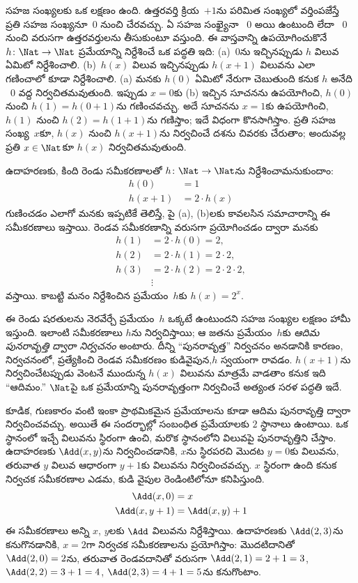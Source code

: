 \documentclass[../../../include/open-logic-section]{subfiles}
\begin{document}

సహజ సంఖ్యలకు ఒక లక్షణం ఉంది. ఉత్తరవర్తి క్రియ~$+1$ను పరిమిత సంఖ్యలో
వర్తింపజేస్తే ప్రతి సహజ సంఖ్యనూ~$0$ నుంచి చేరవచ్చు. ఏ సహజ సంఖ్యైనా
~$0$ అయి ఉంటుంది లేదా ~$0$ నుంచి వరుసగా ఉత్తరవర్తులను తీసుకుంటూ వస్తుంది. ఈ వాస్తవాన్ని
ఉపయోగించుకొనే $h\colon\Nat \to \Nat$ ప్రమేయాన్ని నిర్దేశించే ఒక
పద్ధతి ఇది: (a)~$0$ను ఇచ్చినప్పుడు $h$ విలువ ఏమిటో నిర్దేశించాలి.
(b)~$h(x)$ విలువ ఇచ్చినప్పుడు $h(x+1)$ విలువను ఎలా గణించాలో కూడా
నిర్దేశించాలి. (a) మనకు $h(0)$ ఏమిటో నేరుగా చెబుతుంది కనుక $h$ అనేది
~$0$ వద్ద నిర్వచితమవుతుంది. ఇప్పుడు $x=0$కు (b) ఇచ్చిన సూచనను
ఉపయోగించి, $h(0)$ నుంచి $h(1)=h(0+1)$ను గణించవచ్చు. అదే సూచనను
$x=1$కు ఉపయోగించి, $h(1)$ నుంచి $h(2)=h(1+1)$ను గణిస్తాం; ఇదే విధంగా
కొనసాగిస్తాం. ప్రతి సహజ సంఖ్య~$x$కూ, $h(x)$ నుంచి $h(x+1)$ను
నిర్వచించే దశను చివరకు చేరుతాం; అందువల్ల ప్రతి $x\in\Nat$కూ $h(x)$
నిర్వచితమవుతుంది.

ఉదాహరణకు, కింది రెండు సమీకరణాలతో $h\colon \Nat \to \Nat$ను
నిర్దేశించామనుకుందాం:
\begin{align*}
h(0) & =  1\\
h(x+1) & =  2 \cdot h(x)
\end{align*}
గుణించడం ఎలాగో మనకు ఇప్పటికే తెలిస్తే, పై (a), (b)లకు కావలసిన
సమాచారాన్ని ఈ సమీకరణాలు ఇస్తాయి. రెండవ సమీకరణాన్ని వరుసగా
ప్రయోగించడం ద్వారా మనకు
\begin{align*}
  h(1) & = 2\cdot h(0) = 2,\\
  h(2) & = 2\cdot h(1) = 2\cdot 2,\\
  h(3) & = 2 \cdot h(2) = 2\cdot 2 \cdot 2,\\
  & \vdots
\end{align*}
వస్తాయి. కాబట్టి మనం నిర్దేశించిన ప్రమేయం~$h$కు $h(x)=2^x$.

ఈ రెండు షరతులను నెరవేర్చే ప్రమేయం~$h$ ఒక్కటే ఉంటుందని సహజ సంఖ్యల
లక్షణం హామీ ఇస్తుంది. ఇలాంటి సమీకరణాలు $h$ను నిర్వచిస్తాయి; ఆ జతను ప్రమేయం~$h$కు
\emph{ఆదిమ పునరావృత్తి ద్వారా నిర్వచనం} అంటారు. దీన్ని
``పునరావృత్త'' నిర్వచనం అనడానికి కారణం, నిర్వచనంలో, ప్రత్యేకించి
రెండవ సమీకరణం కుడివైపున,$h$ స్వయంగా రావడం. $h(x+1)$ను
నిర్వచించేటప్పుడు వెంటనే ముందున్న $h(x)$ విలువను మాత్రమే వాడతాం కనుక
ఇది ``ఆదిమం.'' $\Nat$పై ఒక ప్రమేయాన్ని పునరావృత్తంగా నిర్వచించే
అత్యంత సరళ పద్ధతి ఇదే.

కూడిక, గుణకారం వంటి ఇంకా ప్రాథమికమైన ప్రమేయాలను కూడా ఆదిమ
పునరావృత్తి ద్వారా నిర్వచించవచ్చు. అయితే ఈ సందర్భాల్లో సంబంధిత
ప్రమేయాలకు $2$ స్థానాలు ఉంటాయి. ఒక స్థానంలో ఇచ్చే విలువను స్థిరంగా ఉంచి,
మరొక స్థానంలోని విలువపై పునరావృత్తిని చేస్తాం. ఉదాహరణకు $\Add(x,y)$ను
నిర్వచించడానికి, $x$ను స్థిరపరచి మొదట $y=0$కు విలువను, తరువాత $y$
విలువ ఆధారంగా $y+1$కు విలువను నిర్వచించవచ్చు. $x$ స్థిరంగా ఉంది కనుక
నిర్వచక సమీకరణాల ఎడమ, కుడి వైపుల రెండింటిలోనూ కనిపిస్తుంది.
\begin{align*}
\Add(x,0) & =  x\\
\Add(x,y+1) & =  \Add(x,y)+1
\end{align*}
ఈ సమీకరణాలు అన్ని $x$, $y$లకు $\Add$ విలువను నిర్దేశిస్తాయి.
ఉదాహరణకు $\Add(2,3)$ను కనుగొనడానికి, $x=2$గా నిర్వచక సమీకరణాలను
ప్రయోగిస్తాం: మొదటిదానితో $\Add(2,0)=2$ను, తరువాత రెండవదానితో వరుసగా
$\Add(2,1)=2+1=3$, $\Add(2,2)=3+1=4$, $\Add(2,3)=4+1=5$ను
కనుగొంటాం.
\end{document}
